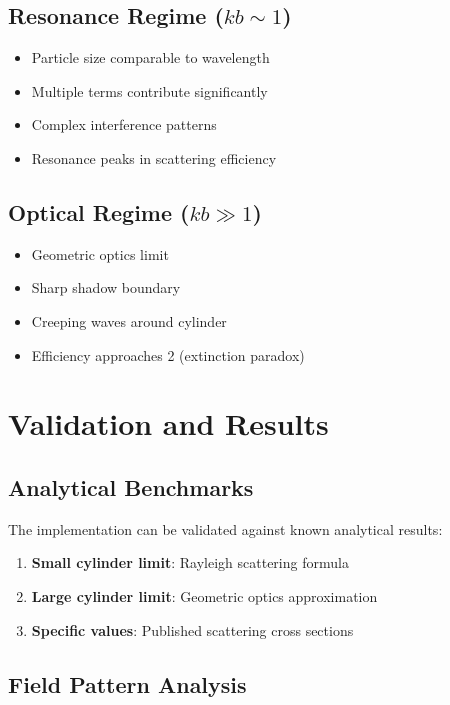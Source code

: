 \documentclass[11pt,a4paper]{article}
\begin{document}
\subsection{Resonance Regime ($kb \sim 1$)}
\begin{itemize}
\item Particle size comparable to wavelength
\item Multiple terms contribute significantly
\item Complex interference patterns
\item Resonance peaks in scattering efficiency
\end{itemize}

\subsection{Optical Regime ($kb \gg 1$)}
\begin{itemize}
\item Geometric optics limit
\item Sharp shadow boundary
\item Creeping waves around cylinder
\item Efficiency approaches 2 (extinction paradox)
\end{itemize}

\section{Validation and Results}

\subsection{Analytical Benchmarks}

The implementation can be validated against known analytical results:

\begin{enumerate}
\item \textbf{Small cylinder limit}: Rayleigh scattering formula
\item \textbf{Large cylinder limit}: Geometric optics approximation
\item \textbf{Specific values}: Published scattering cross sections
\end{enumerate}

\subsection{Field Pattern Analysis}
\end{document}

